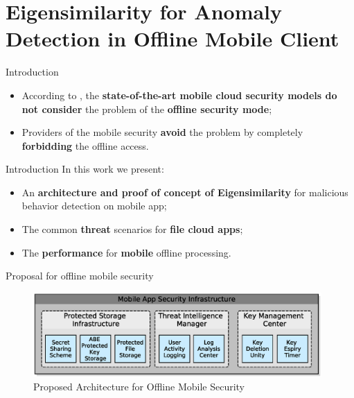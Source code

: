 \documentclass[newPxFont, numfooter, sectionpages]{beamer}
\begin{document}
\section{Eigensimilarity for Anomaly Detection in Offline Mobile Client}
\label{Blocks}

\begin{frame}[c]{Introduction}
	\begin{itemize}
		\item According to \cite{khan2013towards, khan2015cloud}, the \textbf{state-of-the-art mobile cloud security models do not consider} the problem of the \textbf{offline security mode};
		\item Providers of the mobile security \textbf{avoid} the problem by completely \textbf{forbidding} the offline access.
	\end{itemize}
\end{frame}

\begin{frame}[c]{Introduction}
	In this work we present:
	\begin{itemize}
	    \item An \textbf{architecture and proof of concept of Eigensimilarity} for malicious behavior detection on mobile app;
		\item The common \textbf{threat} scenarios for \textbf{file cloud apps};
		\item The \textbf{performance} for \textbf{mobile} offline processing.
	\end{itemize}
\end{frame}


\begin{frame}[c]{Proposal for offline mobile security}
	\begin{figure}[h!]
		\centering
		\includegraphics[width=11cm]{figures/ch3/fig03.eps}
		\caption{Proposed Architecture for Offline Mobile Security}
		\label{fig:3_03}
	\end{figure}
\end{frame}
\end{document}
